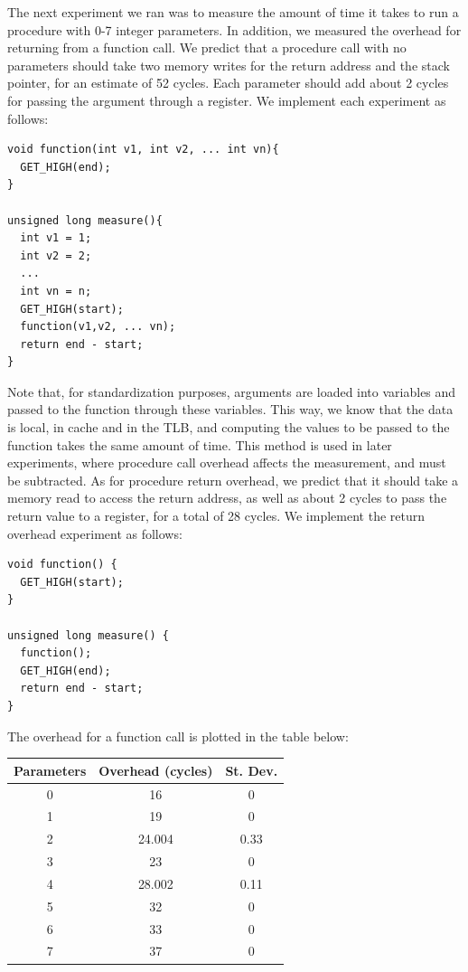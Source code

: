 The next experiment we ran was to measure the amount of time it takes to run a procedure with 0-7 integer parameters. In addition, we measured the overhead for returning from a function call. We predict that a procedure call with no parameters should take two memory writes for the return address and the stack pointer, for an estimate of 52 cycles. Each parameter should add about 2 cycles for passing the argument through a register. We implement each experiment as follows: 
\begin{verbatim}
void function(int v1, int v2, ... int vn){
  GET_HIGH(end);
}

unsigned long measure(){
  int v1 = 1;
  int v2 = 2;
  ...
  int vn = n;
  GET_HIGH(start);
  function(v1,v2, ... vn);
  return end - start;
}
\end{verbatim}

\noindent Note that, for standardization purposes, arguments are loaded into variables and passed to the function through these variables. This way, we know that the data is local, in cache and in the TLB, and computing the values to be passed to the function takes the same amount of time. This method is used in later experiments, where procedure call overhead affects the measurement, and must be subtracted.
\newline
\newline
As for procedure return overhead, we predict that it should take a memory read to access the return address, as well as about 2 cycles to pass the return value to a register, for a total of 28 cycles. We implement the return overhead experiment as follows:
\begin{verbatim}
void function() {
  GET_HIGH(start);
}

unsigned long measure() {
  function();
  GET_HIGH(end);
  return end - start;
}
\end{verbatim}

\newpage

\noindent The overhead for a function call is plotted in the table below:
\newline
\newline
\begin{tabular}{c|c|c}

	\textbf{Parameters} & \textbf{Overhead (cycles)} & \textbf{St. Dev.} \\\hline
	0 & 16 & 0\\\hline
	1 & 19 & 0\\\hline
	2 & 24.004 & 0.33\\\hline
	3 & 23 & 0\\\hline
	4 & 28.002 & 0.11\\\hline
	5 & 32 & 0\\\hline
	6 & 33 & 0\\\hline
	7 & 37 & 0\\\hline

\end{tabular}
\newline
\newline

